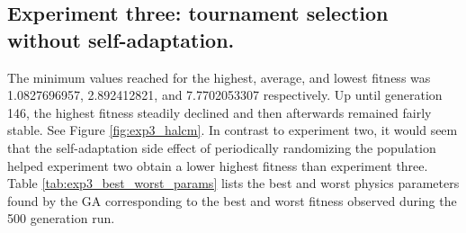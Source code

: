 

\newpage

\subsection[Experiment Three]{Experiment three: tournament selection without self-adaptation.}

The minimum values reached for the highest, average, and lowest fitness was 1.0827696957, 2.892412821, and 7.7702053307 respectively. Up until generation 146, the highest fitness steadily declined and then afterwards remained fairly stable. See Figure \ref{fig:exp3_halcm}. In contrast to experiment two, it would seem that the self-adaptation side effect of periodically randomizing the population helped experiment two obtain a lower highest fitness than experiment three. Table \ref{tab:exp3_best_worst_params} lists the best and worst physics parameters found by the GA corresponding to the best and worst fitness observed during the 500 generation run.

